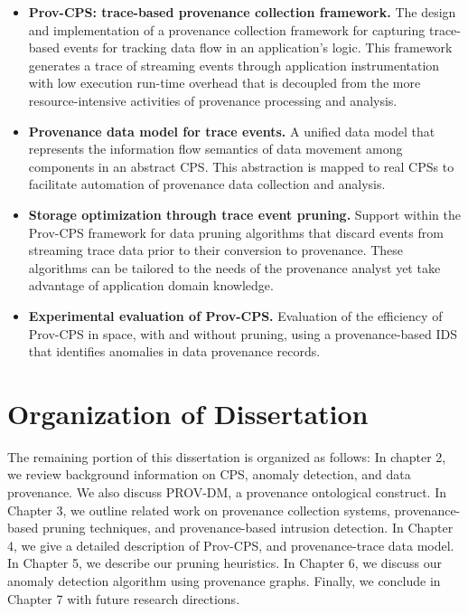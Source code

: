 \begin{itemize}

\item \textbf{Prov-CPS: trace-based provenance collection framework.} The design and implementation of a provenance collection framework for capturing trace-based events for tracking data flow in an application's logic. This framework generates a trace of streaming events through application instrumentation with low execution run-time overhead that is decoupled from the more resource-intensive activities of provenance processing and analysis.

\item \textbf{Provenance data model for trace events.} A unified data model that represents the information flow semantics of data movement among components in an abstract CPS. This abstraction is mapped to real CPSs to facilitate automation of provenance data collection and analysis.

\item \textbf{Storage optimization through trace event pruning.} Support within the Prov-CPS framework for data pruning algorithms that discard events from streaming trace data prior to their conversion to provenance. These algorithms can be tailored to the needs of the provenance analyst yet take advantage of application domain knowledge.

\item \textbf{Experimental evaluation of Prov-CPS.} Evaluation of the efficiency of Prov-CPS in space, with and without pruning, using a provenance-based IDS that identifies anomalies in data provenance records.



\end{itemize}

\section{Organization of Dissertation}

The remaining portion of this dissertation is organized as follows: In chapter 2, we review background information on CPS, anomaly detection, and data provenance. We also discuss PROV-DM, a provenance ontological construct. In Chapter 3, we outline related work on provenance collection systems, provenance-based pruning techniques, and provenance-based intrusion detection. In Chapter 4, we give a detailed description of Prov-CPS, and provenance-trace data model. In Chapter 5, we describe our pruning heuristics. In Chapter 6, we discuss our anomaly detection algorithm using provenance graphs. Finally, we conclude in Chapter 7 with future research directions.

